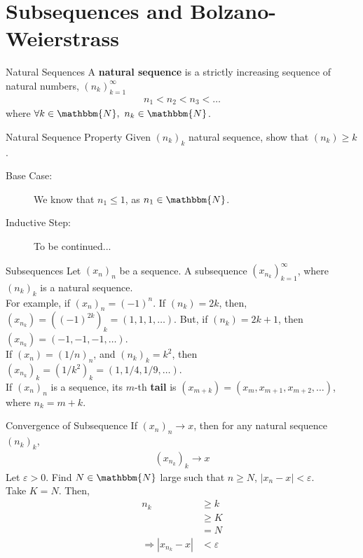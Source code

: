 \documentclass[10pt]{extarticle}
\newcommand{\N}{\mathbbm{N}}
\begin{document}
  \section{Subsequences and Bolzano-Weierstrass}%
  \begin{problem}{Natural Sequences}
    A \textbf{natural sequence} is a strictly increasing sequence of natural numbers, $(n_{k})_{k=1}^{\infty}$
    \begin{align*}
      n_{1} < n_2 < n_3<\dots
    \end{align*}
    where $\forall k\in\N,~n_k\in\N$.
    \begin{problem}{Natural Sequence Property}
      Given $(n_k)_k$ natural sequence, show that $(n_k) \geq k$.
      \tcblower
      \begin{description}
        \item[Base Case:] We know that $n_1 \leq 1$, as $n_1\in\N$.
        \item[Inductive Step:] To be continued...
      \end{description}
    \end{problem}
  \end{problem}
  \begin{problem}{Subsequences}
    Let $(x_n)_n$ be a sequence. A subsequence $(x_{n_k})_{k=1}^{\infty}$, where $(n_k)_{k}$ is a natural sequence.\\

    For example, if $(x_n)_n = (-1)^n$. If $(n_k) = 2k$, then, $(x_{n_k}) = \left((-1)^{2k}\right)_k = (1,1,1,\dots)$. But, if $(n_k) = 2k+1$, then $(x_{n_k}) = (-1,-1,-1,\dots)$.\\

    If $(x_n) = (1/n)_n$, and $(n_k)_k = k^2$, then $(x_{n_k})_{k} = (1/k^2)_{k} = (1,1/4,1/9,\dots)$.\\

    If $(x_n)_n$ is a sequence, its $m$-th \textbf{tail} is $(x_{m+k}) = (x_m,x_{m+1},x_{m+2},\dots)$, where $n_k = m+k$.
  \end{problem}
  \begin{problem}{Convergence of Subsequence}
    If $(x_n)_n \rightarrow x$, then for any natural sequence $(n_k)_k$,
    \begin{align*}
      \left(x_{n_k}\right)_k \rightarrow x
    \end{align*}
    \tcblower
    Let $\varepsilon > 0$. Find $N\in\N$ large such that $n \geq N$, $|x_{n} - x| < \varepsilon$.\\

    Take $K = N$. Then,
    \begin{align*}
      n_k &\geq k\\
      &\geq K\\
      &= N\\
      \Rightarrow |x_{n_k} - x| &< \varepsilon
    \end{align*}
  \end{problem}
\end{document}
